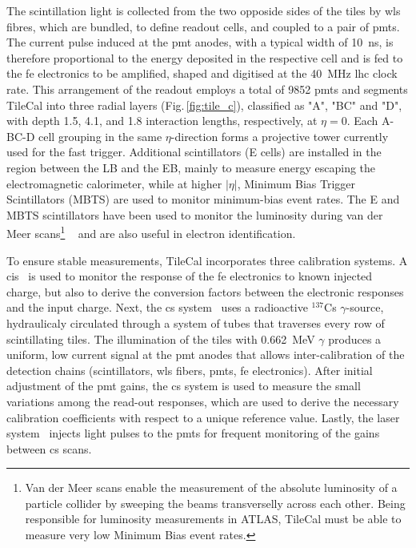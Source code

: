 The scintillation light is collected from the two opposide sides of the tiles by \gls{wls} fibres, which are bundled,
to define readout cells, and coupled to a pair of \glspl{pmt}. The current pulse induced at the \gls{pmt} anodes, with 
a typical width of \SI{10}{\ns}, is therefore proportional to the energy deposited in the respective cell and is fed to 
the \gls{fe} electronics to be amplified, shaped and digitised at the \SI{40}{MHz} \gls{lhc} clock rate. This arrangement 
of the readout employs a total of 9852 \glspl{pmt} and segments \gls{TileCal} into three radial layers (Fig.\,\ref{fig:tile_c}), 
classified as "A", "BC" and "D", with depth 1.5, 4.1, and 1.8 interaction lengths, respectively,
at $\eta=0$. Each A-BC-D cell grouping in the same $\eta$-direction forms a projective tower currently used for the fast 
trigger. Additional scintillators (E cells) are installed in the region between the LB and the EB, mainly to measure energy 
escaping the electromagnetic calorimeter, while at higher $|\eta|$, Minimum Bias Trigger Scintillators (MBTS) are used to 
monitor minimum-bias event rates. The E and MBTS scintillators have been used to monitor the luminosity during van der Meer 
scans\footnote{
Van der Meer scans enable the measurement of the absolute luminosity of a particle collider by 
sweeping the beams transverselly across each other. Being responsible for luminosity measurements 
in ATLAS, \gls{TileCal} must be able to measure very low Minimum Bias event rates.}
~\cite{Balagura:2011yw} and are also useful in electron identification.

To ensure stable measurements, \gls{TileCal} incorporates three calibration systems. A \gls{cis}~\cite{Tang:2013vya} 
is used to monitor the response of the \gls{fe} electronics to known injected charge, but also to derive the conversion 
factors between the electronic responses and the input charge. Next, the \gls{cs} system~\cite{Starchenko:2002ju,Shalanda:2003rq} 
uses a radioactive $^{137}$Cs $\gamma$-source, hydraulicaly circulated through a system of tubes that traverses every row 
of scintillating tiles. The illumination of the tiles with \SI{0.662}{MeV} $\gamma$ produces a uniform, low current signal 
at the \gls{pmt} anodes that allows inter-calibration of the detection chains (scintillators, \gls{wls} fibers, \glspl{pmt}, 
\gls{fe} electronics). After initial adjustment of the \gls{pmt} gains, the \gls{cs} system is used to measure the small
variations among the read-out responses, which are used to derive the necessary calibration coefficients with respect to
a unique reference value. Lastly, the laser system~\cite{system:2016tae} injects light pulses to the \glspl{pmt} for 
frequent monitoring of the gains between \gls{cs} scans.

